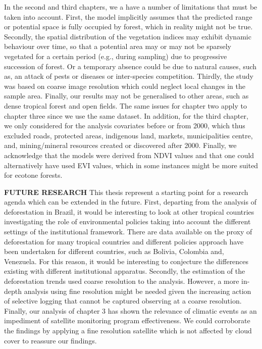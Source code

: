 In the second and third chapters, we a have a number of limitations that must be taken into account. First, the model implicitly assumes that the predicted range or potential space is fully occupied by forest, which in reality might not be true. Secondly, the spatial distribution of the vegetation indices may exhibit dynamic behaviour over time, so that a potential area may or may not be sparsely vegetated for a certain period (e.g., during sampling) due to progressive succession of forest. Or a temporary absence could be due to natural causes, such as, an attack of pests or diseases or inter-species competition. Thirdly, the study was based on coarse image resolution which could neglect local changes in the sample area. Finally, our results may not  be generalised to other areas, such as dense tropical forest and open fields. The same issues for chapter two apply to chapter three since we use the same dataset. In addition, for the third chapter, we only considered for the analysis covariates before or from 2000, which thus excluded roads, protected areas, indigenous land, markets, municipalities centre, and, mining/mineral resources created or discovered after 2000. Finally, we acknowledge that the models were derived from NDVI values and that one could alternatively have used EVI values, which in some instances might be more suited for ecotone forests.


\textbf{FUTURE RESEARCH} This thesis represent a starting point for a research agenda which can be extended in the future. First, departing from the analysis of deforestation in Brazil, it would be interesting to look at other tropical countries investigating the role of environmental policies taking into account the different settings of the institutional framework. There are data available on the proxy of deforestation for many tropical countries and different policies approach have been undertaken for different countries, such as Bolivia, Colombia and, Venezuela. For this reason, it would be interesting to conjecture the differences existing with different institutional apparatus. Secondly, the estimation of the deforestation trends used coarse resolution to the analysis. However, a more in-depth analysis using fine resolution might be needed given the increasing action of selective logging that cannot be captured observing at a coarse resolution. Finally, our analysis of chapter 3 has shown the relevance of climatic events as an impediment of satellite monitoring program effectiveness. We could corroborate the findings by applying a fine resolution satellite which is not affected by cloud cover to reassure our findings.